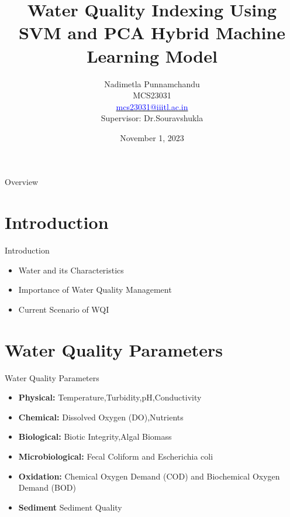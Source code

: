 \documentclass[11pt]{beamer}
\title[Water Quality Indexing]{Water Quality Indexing  Using SVM and PCA Hybrid Machine Learning Model}
\author[Nadimetla Punnamchandu]{Nadimetla Punnamchandu  \\MCS23031 \\ \href{mcs23031@iiitl.ac.in}{\textcolor{blue}{mcs23031@iiitl.ac.in}} \\ \vspace{0.2cm}
  Supervisor:  Dr.Souravshukla}
\institute[IIITL]{\large{\small  Indian Institute of Information Technology,  Lucknow}\vspace{0.5cm}}
\date{November 1, 2023}
\begin{document}
\maketitle

\begin{frame}{Overview}

\tableofcontents

\end{frame}
\section{Introduction}
\begin{frame}{Introduction}
\begin{itemize}
    \item Water and its Characteristics
    \item Importance of Water Quality Management 
     \item Current Scenario of WQI
     
\end{itemize}
    
\end{frame}



\section{Water Quality Parameters}
\begin{frame}{Water Quality Parameters}
   \begin{itemize}
      
       \item \textbf{Physical:} Temperature,Turbidity,pH,Conductivity 

    \item \textbf{Chemical:} Dissolved Oxygen (DO),Nutrients 

    \item \textbf{Biological:} Biotic Integrity,Algal Biomass
   
    \item \textbf{Microbiological:} Fecal Coliform and Escherichia coli
   
    \item \textbf{Oxidation:} Chemical Oxygen Demand (COD) and Biochemical Oxygen Demand (BOD)
    \item \textbf{Sediment} Sediment Quality
    
    
    
 
   \end{itemize}
    

\end{frame}
\end{document}
